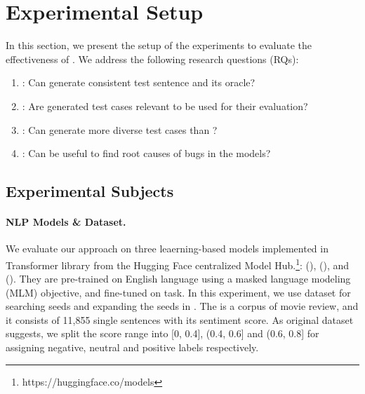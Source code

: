 \section{Experimental Setup}
\label{sec:experiment}
%
In this section, we present the setup of the experiments to evaluate
the effectiveness of \tool{}. We address the following research
questions (RQs):


\begin{enumerate}[label=\textbf{RQ\arabic*}]
\item \label{rq:one}: Can \tool generate consistent test sentence and
  its oracle?
\item \label{rq:two}: Are \tool generated test cases relevant to be used
  for their \lc evaluation?
\item \label{rq:three}: Can \tool generate more diverse test cases
  than \Cklst?
\item \label{rq:four}: Can \tool be useful to find root causes of bugs
  in the \sa models?
\end{enumerate}





\subsection{Experimental Subjects}

\paragraph{\textbf{NLP Models \& Dataset.}}
We evaluate our approach on three leaerning-based \sa models
implemented in Transformer library from the Hugging Face centralized
Model Hub.\footnote{https://huggingface.co/models}: \texttt{\Bert}
(\bertsamodel), \texttt{\Roberta} (\robertasamodel), and
\texttt{\Dbert} (\disbertsamodel). They are pre-trained on English
language using a masked language modeling (MLM) objective, and
fine-tuned on \sa task. In this experiment, we use \Sstt dataset for
searching seeds and expanding the seeds in \tool. The \Sstt is a
corpus of movie review, and it consists of 11,855 single sentences
with its sentiment score. As original dataset suggests, we split the
score range into [0, 0.4], (0.4, 0.6] and (0.6, 0.8] for assigning
    negative, neutral and positive labels respectively.

